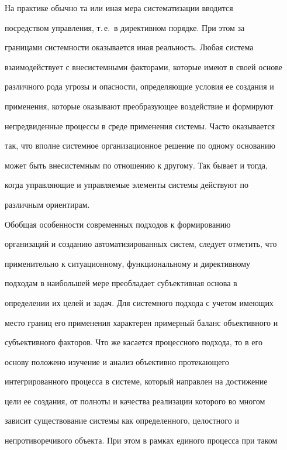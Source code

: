        


       На практике обычно та или иная мера систематизации вводится 


посредством управления, т.\,е.\ в директивном порядке. При этом за 


границами системности  оказывается иная реальность. Любая система 


взаимодействует с внесистемными факторами, которые имеют в своей основе 


различного рода угрозы и опасности, определяющие условия ее создания и 


применения, которые оказывают преобразующее воздействие и формируют 


непредвиденные процессы в среде применения системы. Часто оказывается 


так, что вполне системное организационное решение по одному основанию 


может быть внесистемным по отношению к другому. Так бывает и тогда, 


когда управляющие и управляемые элементы системы действуют по 


различным ориентирам.


       


       Обобщая особенности современных подходов к формированию 


организаций и созданию автоматизированных систем, следует отметить, что 


применительно к ситуационному, функциональному и директивному 


подходам в наибольшей мере преобладает субъективная основа в 


определении их целей и задач. Для системного подхода с учетом имеющих 


место границ его применения характерен примерный баланс объективного и 


субъективного факторов. Что же касается процессного подхода, то в его 


основу положено изучение и анализ объективно протекающего 


интегрированного процесса в системе, который направлен на достижение 


цели ее создания, от полноты и качества реализации которого во многом 


зависит существование системы как определенного, целостного и 


непротиворечивого объекта. При этом в рамках единого процесса при таком 


